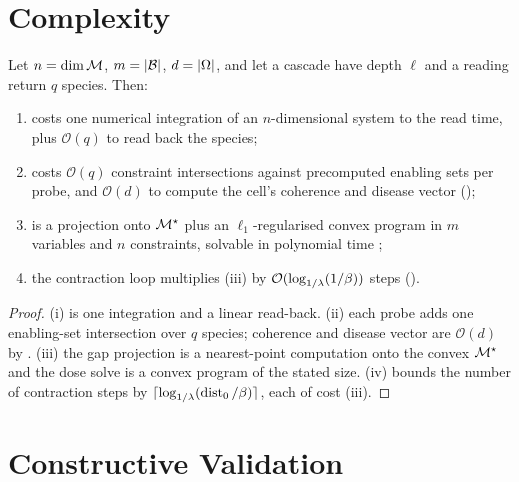 \section{Complexity}
\label{cfc:sec:complexity}

\begin{proposition}
\label{cfc:prop:complexity}
Let $n=\dim\mathcal{M}$, $m=\abs{\mathcal{B}}$, $d=\abs{\Omega}$, and let a cascade have
depth $\ell$ and a reading return $q$ species. Then:
\begin{enumerate}[label=\textup{(\roman*)},leftmargin=2.2em,itemsep=2pt]
\item {} costs one numerical integration of an $n$-dimensional system
to the read time, plus $\mathcal{O}(q)$ to read back the species;
\item {} costs $\mathcal{O}(q)$ constraint intersections against
precomputed enabling sets per probe, and $\mathcal{O}(d)$ to compute the cell's
coherence and disease vector ();
\item {} is a projection onto $\mathcal{M}^{\star}$ plus an $\ell_1$-regularised convex
program in $m$ variables and $n$ constraints, solvable in polynomial time
\citep{boyd2004convex};
\item the  contraction loop multiplies (iii) by
$\mathcal{O}(\log_{1/\lambda}(1/\beta))$ steps ().
\end{enumerate}
\end{proposition}

\begin{proof}
(i) is one integration and a linear read-back. (ii) each probe adds one
enabling-set intersection over $q$ species; coherence and disease vector are
$\mathcal{O}(d)$ by . (iii) the gap projection is a
nearest-point computation onto the convex $\mathcal{M}^{\star}$ and the dose solve is a convex
program of the stated size. (iv)  bounds the number of
contraction steps by $\lceil\log_{1/\lambda}(\operatorname{dist}_0/\beta)\rceil$, each of cost
(iii).
\end{proof}

\section{Constructive Validation}
\label{cfc:sec:validation}

